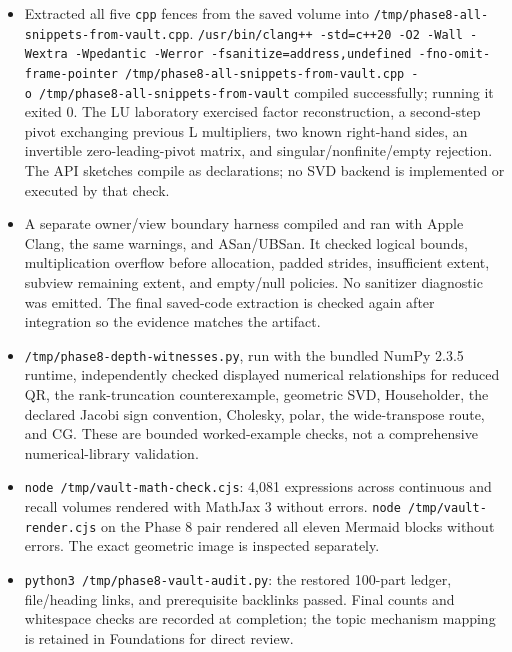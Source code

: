 \begin{itemize}
\tightlist
\item
  Extracted all five \texttt{cpp} fences from the saved volume into \texttt{/tmp/phase8-all-snippets-from-vault.cpp}. \texttt{/usr/bin/clang++\ -std=c++20\ -O2\ -Wall\ -Wextra\ -Wpedantic\ -Werror\ -fsanitize=address,undefined\ -fno-omit-frame-pointer\ /tmp/phase8-all-snippets-from-vault.cpp\ -o\ /tmp/phase8-all-snippets-from-vault} compiled successfully; running it exited 0. The LU laboratory exercised factor reconstruction, a second-step pivot exchanging previous L multipliers, two known right-hand sides, an invertible zero-leading-pivot matrix, and singular/nonfinite/empty rejection. The API sketches compile as declarations; no SVD backend is implemented or executed by that check.
\item
  A separate owner/view boundary harness compiled and ran with Apple Clang, the same warnings, and ASan/UBSan. It checked logical bounds, multiplication overflow before allocation, padded strides, insufficient extent, subview remaining extent, and empty/null policies. No sanitizer diagnostic was emitted. The final saved-code extraction is checked again after integration so the evidence matches the artifact.
\item
  \texttt{/tmp/phase8-depth-witnesses.py}, run with the bundled NumPy 2.3.5 runtime, independently checked displayed numerical relationships for reduced QR, the rank-truncation counterexample, geometric SVD, Householder, the declared Jacobi sign convention, Cholesky, polar, the wide-transpose route, and CG. These are bounded worked-example checks, not a comprehensive numerical-library validation.
\item
  \texttt{node\ /tmp/vault-math-check.cjs}: 4,081 expressions across continuous and recall volumes rendered with MathJax 3 without errors. \texttt{node\ /tmp/vault-render.cjs} on the Phase 8 pair rendered all eleven Mermaid blocks without errors. The exact geometric image is inspected separately.
\item
  \texttt{python3\ /tmp/phase8-vault-audit.py}: the restored 100-part ledger, file/heading links, and prerequisite backlinks passed. Final counts and whitespace checks are recorded at completion; the topic mechanism mapping is retained in Foundations for direct review.
\end{itemize}

